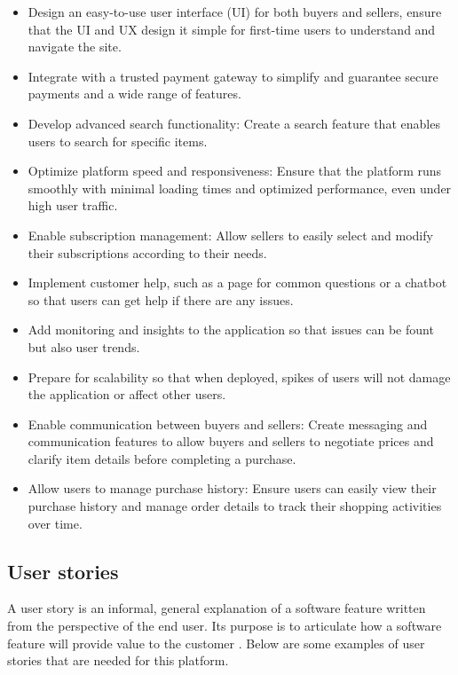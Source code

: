 \documentclass[]{project_report}
\begin{document}
\begin{itemize}
    \item Design an easy-to-use user interface (UI) for both buyers and sellers, ensure that the UI and UX design it simple for first-time users to understand and navigate the site.
    \item Integrate with a trusted payment gateway to simplify and guarantee secure payments and a wide range of features.
    \item Develop advanced search functionality: Create a search feature that enables users to search for specific items.
    \item Optimize platform speed and responsiveness: Ensure that the platform runs smoothly with minimal loading times and optimized performance, even under high user traffic.
    \item Enable subscription management: Allow sellers to easily select and modify their subscriptions according to their needs.
    \item Implement customer help, such as a page for common questions or a chatbot so that users can get help if there are any issues.
    \item Add monitoring and insights to the application so that issues can be fount but also user trends.
    \item Prepare for scalability so that when deployed, spikes of users will not damage the application or affect other users.
    \item Enable communication between buyers and sellers: Create messaging and communication features to allow buyers and sellers to negotiate prices and clarify item details before completing a purchase.
    \item Allow users to manage purchase history: Ensure users can easily view their purchase history and manage order details to track their shopping activities over time.
\end{itemize}

\subsection{User stories}

A user story is an informal, general explanation of a software feature written from the perspective of the end user. Its purpose is to articulate how a software feature will provide value to the customer \cite{user_stories}. Below are some examples of user stories that are needed for this platform.
\end{document}
